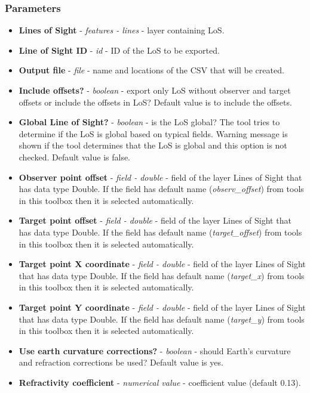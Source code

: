 \documentclass[]{article}
\begin{document}
\subsubsection{Parameters}
\begin{itemize}
	\item \textbf{Lines of Sight} - \textit{features - lines} - layer containing LoS.
	\item \textbf{Line of Sight ID} - \textit{id} - ID of the LoS to be exported.
	\item \textbf{Output file} - \textit{file} - name and locations of the CSV that will be created.
	\item \textbf{Include offsets?} -  \textit{boolean} - export only LoS without observer and target offsets or include the offsets in LoS? Default value is to include the offsets.
	\item \textbf{Global Line of Sight?} - \textit{boolean} - is the LoS global? The tool tries to determine if the LoS is global based on typical fields. Warning message is shown if the tool determines that the LoS is global and this option is not checked. Default value is false.
	\item \textbf{Observer point offset} - \textit{field - double} - field of the layer Lines of Sight that has data type Double. If the field has default name (\textit{observ\_offset}) from tools in this toolbox then it is selected automatically.
	\item \textbf{Target point offset} - \textit{field - double} - field of the layer Lines of Sight that has data type Double. If the field has default name (\textit{target\_offset}) from tools in this toolbox then it is selected automatically.
	\item \textbf{Target point X coordinate} - \textit{field - double} - field of the layer Lines of Sight that has data type Double. If the field has default name (\textit{target\_x}) from tools in this toolbox then it is selected automatically.
	\item \textbf{Target point Y coordinate} - \textit{field - double} - field of the layer Lines of Sight that has data type Double. If the field has default name (\textit{target\_y}) from tools in this toolbox then it is selected automatically.
	\item \textbf{Use earth curvature corrections?} - \textit{boolean} - should Earth's curvature and refraction corrections be used? Default value is yes.
	\item \textbf{Refractivity coefficient} - \textit{numerical value}  - coefficient value (default 0.13).
\end{itemize}
\end{document}
